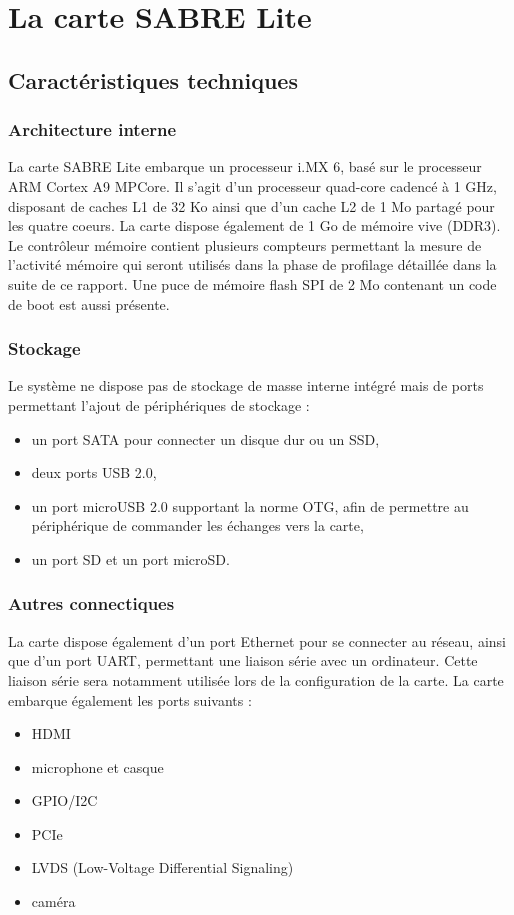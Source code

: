 \section{La carte SABRE Lite}

\subsection{Caractéristiques techniques}

\subsubsection{Architecture interne}
La carte SABRE Lite\cite{_i.mx_2014} embarque un processeur i.MX 6, basé sur le
processeur ARM Cortex A9 MPCore. Il s'agit d'un processeur quad-core cadencé à
1 GHz, disposant de caches L1 de 32 Ko ainsi que d'un cache L2 de 1 Mo partagé
pour les quatre coeurs. La carte dispose également de 1 Go de mémoire vive
(DDR3). Le contrôleur mémoire contient plusieurs compteurs permettant la mesure
de l'activité mémoire qui seront utilisés dans la phase de profilage détaillée
dans la suite de ce rapport. Une puce de mémoire flash SPI de 2 Mo contenant un
code de boot est aussi présente.

\subsubsection{Stockage}
Le système ne dispose pas de stockage de masse interne intégré mais de ports
permettant l'ajout de périphériques de stockage :
\begin{itemize}
\renewcommand{\labelitemi}{$\bullet$}
\item un port SATA pour connecter un disque dur ou un SSD,
\item deux ports USB 2.0,
\item un port microUSB 2.0 supportant la norme OTG, afin de permettre au 
  périphérique de commander les échanges vers la carte,
\item un port SD et un port microSD.
\end{itemize}

\subsubsection{Autres connectiques}
La carte dispose également d'un port Ethernet pour se connecter au réseau, ainsi
que d'un port UART, permettant une liaison série avec un ordinateur. Cette
liaison série sera notamment utilisée lors de la configuration de la carte. La
carte embarque également les ports suivants :
\begin{itemize}
\renewcommand{\labelitemi}{$\bullet$}
\item HDMI
\item microphone et casque
\item GPIO/I2C
\item PCIe
\item LVDS (Low-Voltage Differential Signaling)
\item caméra
\end{itemize}


